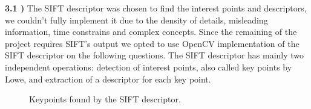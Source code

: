 \documentclass[12pt,a4paper]{article}
\begin{document}
\textbf{3.1 )} The SIFT descriptor was chosen to find the interest points and descriptors, we couldn't fully implement it due to the density of details, misleading information, time constrains and complex concepts. Since the remaining of the project requires SIFT's output we opted to use OpenCV implementation of the SIFT descriptor on the following questions. The SIFT descriptor has mainly two independent operations: detection of interest points, also called key points by Lowe, and extraction of a descriptor for each key point. \\

\begin{figure}[!h]
	\centering
	\quad
	\caption{Keypoints found by the SIFT descriptor.}
	\label{fig:keypoints}
\end{figure}
\end{document}

